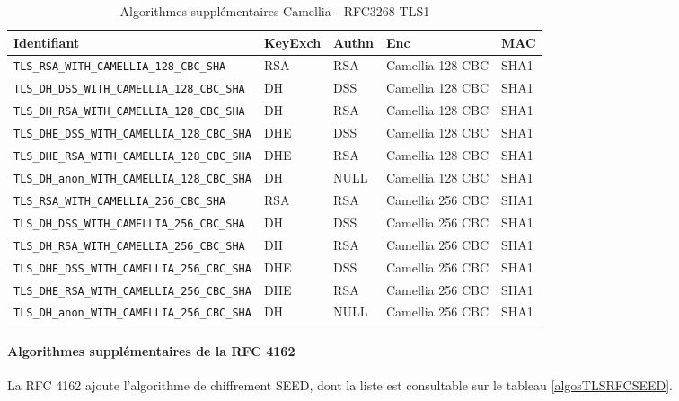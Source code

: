 \begin{table}[H]
\centering
\begin{tabularx}{17cm}{|l|l|l|X|l|}
\hline
\textbf{Identifiant} & \textbf{KeyExch} & \textbf{Authn}& \textbf{Enc}& \textbf{MAC}\\
\hline
\verb+TLS_RSA_WITH_CAMELLIA_128_CBC_SHA+&RSA&RSA&Camellia 128 CBC&SHA1\\
\hline
\verb+TLS_DH_DSS_WITH_CAMELLIA_128_CBC_SHA+&DH&DSS&Camellia 128 CBC&SHA1\\
\hline 
\verb+TLS_DH_RSA_WITH_CAMELLIA_128_CBC_SHA+&DH&RSA&Camellia 128 CBC&SHA1\\
\hline 
\verb+TLS_DHE_DSS_WITH_CAMELLIA_128_CBC_SHA+&DHE&DSS&Camellia 128 CBC&SHA1\\
\hline
\verb+TLS_DHE_RSA_WITH_CAMELLIA_128_CBC_SHA+&DHE&RSA&Camellia 128 CBC&SHA1\\
\hline
\verb+TLS_DH_anon_WITH_CAMELLIA_128_CBC_SHA+ &DH&NULL&Camellia 128 CBC&SHA1\\
\hline
\verb+TLS_RSA_WITH_CAMELLIA_256_CBC_SHA+&RSA&RSA&Camellia 256 CBC&SHA1 \\
\hline
\verb+TLS_DH_DSS_WITH_CAMELLIA_256_CBC_SHA+& DH&DSS&Camellia 256 CBC&SHA1\\
\hline
\verb+TLS_DH_RSA_WITH_CAMELLIA_256_CBC_SHA+&DH&RSA&Camellia 256 CBC&SHA1\\
\hline
\verb+TLS_DHE_DSS_WITH_CAMELLIA_256_CBC_SHA+& DHE&DSS&Camellia 256 CBC&SHA1\\
\hline
\verb+TLS_DHE_RSA_WITH_CAMELLIA_256_CBC_SHA+& DHE&RSA&Camellia 256 CBC&SHA1\\
\hline
\verb+TLS_DH_anon_WITH_CAMELLIA_256_CBC_SHA+& DH&NULL&Camellia 256 CBC&SHA1\\
\hline
\end{tabularx}
\caption{Algorithmes supplémentaires Camellia - RFC3268 TLS1}
\label{algosTLSRFCCAM}
\end{table}

\paragraph{Algorithmes supplémentaires de la RFC 4162} 
La RFC 4162 \cite{rfc4162} ajoute l'algorithme de chiffrement SEED, dont la liste est consultable sur le tableau \ref{algosTLSRFCSEED}.


